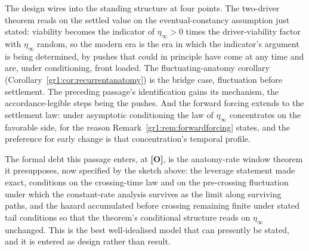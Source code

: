 The design wires into the standing structure at four points. The two-driver theorem reads on the settled value on the eventual-constancy assumption just stated: viability becomes the indicator of $\eta_\infty>0$ times the driver-viability factor with $\eta_\infty$ random, so the modern era is the era in which the indicator's argument is being determined, by pushes that could in
principle have come at any time and are, under conditioning, front
loaded. The fluctuating-anatomy corollary
(Corollary~\ref{gr1:cor:recurrentanatomy}) is the bridge case,
fluctuation before settlement. The preceding passage's
identification gains its mechanism, the accordance-legible steps
being the pushes. And the forward forcing extends to the settlement
law: under asymptotic conditioning the law of $\eta_\infty$
concentrates on the favorable side, for the reason
Remark~\ref{gr1:rem:forwardforcing} states, and the preference for
early change is that concentration's temporal profile.

The formal debt this passage enters, at \textbf{[O]}, is the
anatomy-rate window theorem it presupposes, now specified by the
sketch above: the leverage statement made exact, conditions on the
crossing-time law and on the pre-crossing fluctuation under which
the constant-rate analysis survives as the limit along surviving
paths, and the hazard accumulated before crossing remaining finite
under stated tail conditions so that the theorem's conditional
structure reads on $\eta_\infty$ unchanged. This is the best
well-idealised model that can presently be stated, and it is
entered as design rather than result.

